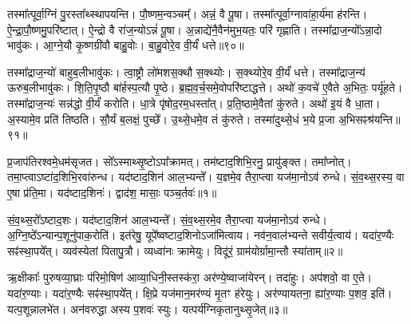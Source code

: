 तस्मा᳚त्पूर्वा॒ग्निं पु॒रस्ता᳚थ्स्थापयन्ति।
पौ॒ष्णम॒न्वञ्चम्᳚।
अन्नं॒ वै पू॒षा।
तस्मा᳚त्पूर्वा॒ग्नावा॑\-हा॒र्य॑मा ह॑रन्ति।
ऐ॒न्द्रा॒पौ॒ष्णमु॒परि॑ष्टात्।
ऐ॒न्द्रो वै रा॑ज॒न्यो\-ऽन्नं॑ पू॒षा।
अ॒न्नाद्ये॑नै॒वैन॑मुभ॒यतः॒ परि॑ गृह्णाति।
तस्मा᳚द्राज॒न्यो᳚\-ऽन्ना॒दो भावु॑कः।
आ॒ग्ने॒यौ कृ॒ष्णग्री॑वौ बाहु॒वोः।
बा॒हु॒वोरे॒व वी॒र्यं॑ धत्ते॥९०॥\ip

तस्मा᳚द्राज॒न्यो॑ बाहुब॒लीभावु॑कः।
त्वा॒ष्ट्रौ लो॑मशस॒क्थौ स॒क्थ्योः।
स॒क्थ्योरे॒व वी॒र्यं॑ धत्ते।
तस्मा᳚द्राज॒न्य॑ ऊरुब॒लीभावु॑कः।
शि॒ति॒पृ॒ष्ठौ बा॑र्\mbox{}हस्प॒त्यौ पृ॒ष्ठे।
ब्र॒ह्म॒व॒र्च॒समे॒वोपरि॑ष्टाद्धत्ते।
अथो॑ क॒वचे॑ ए॒वैते अ॒भितः॒ पर्यू॑हते।
तस्मा᳚द्राज॒न्यः॑ सन्न॑द्धो वी॒र्यं॑ करोति।
धा॒त्रे पृ॑षोद॒रम॒धस्ता᳚त्।
प्र॒ति॒ष्ठामे॒वैतां कु॑रुते।
अथो॑ इ॒यं वै धा॒ता।
अ॒स्यामे॒व प्रति॑ तिष्ठति।
सौ॒र्यं ब॒लक्षं॒ पुच्छे᳚।
उ॒थ्से॒धमे॒व तं कु॑रुते।
तस्मा॑दुथ्से॒धं भ॒ये प्र॒जा अ॒भिसꣴश्र॑यन्ति॥९१॥\ip\anuvakamend[कु॒रु॒ते॒ ध॒त्ते॒ कु॒रु॒ते॒ पञ्च॑ च]


\setcounter{anuvakam}{0}

प्र॒जा\-प॑तिरश्वमे॒धम॑\-सृजत।
सो᳚ऽस्माथ्सृ॒ष्टो\-ऽपा᳚क्रामत्।
तम॑ष्टा\-द॒शिभि॒\-रनु॒\- प्रायु॑ङ्क्त।
तमा᳚प्नोत्।
तमा॒प्त्वा\-ऽष्टा॑द॒शिभि॒रवा॑\-रुन्ध।
यद॑ष्टा\-द॒शिन॑ आल॒भ्यन्ते᳚।
य॒ज्ञमे॒व तैरा॒प्त्वा यज॑मा॒नो\-ऽव॑ रुन्धे।
सं॒व॒थ्स॒\-र\-स्य॒ वा ए॒षा प्र॑ति॒मा।
यद॑ष्टाद॒शिनः॑।
द्वाद॑श॒ मासाः॒ पञ्च॒र्तवः॑॥१॥\ip

सं॒व॒थ्स॒रो᳚\-ऽष्टाद॒शः।
यद॑ष्टाद॒शिन॑ आल॒भ्यन्ते᳚।
सं॒व॒थ्स॒रमे॒व तैरा॒प्त्वा यज॑मा॒नो\-ऽव॑ रुन्धे।
अ॒ग्नि॒ष्ठे᳚\-ऽन्यान्प॒शूनु॑पाक॒रोति॑।
इत॑रेषु॒ यूपे᳚ष्वष्टाद॒शिनो\-ऽजा॑मित्वाय।
नव॑न॒वाल॑भ्यन्ते सवीर्य॒त्वाय॑।
यदा॑र॒ण्यैः सꣴ॑स्था॒पये᳚त्।
व्यव॑स्येतां पितापु॒त्रौ।
व्यध्वा॑नः क्रामेयुः।
विदू॑रं॒ ग्राम॑योर्ग्रामा॒न्तौ स्या॑ताम्॥२॥\ip

ऋ॒क्षीकाः᳚ पुरुषव्या॒घ्राः प॑रिमो॒षिण॑ आव्या॒धिनी॒स्तस्क॑रा॒ अर॑ण्ये॒ष्वाजा॑येरन्।
तदा॑हुः।
अप॑शवो॒ वा ए॒ते।
यदा॑र॒ण्याः।
यदा॑र॒ण्यैः सꣴ॑स्था॒पये᳚त्।
क्षि॒प्रे यज॑मान॒मर॑ण्यं मृ॒तꣳ ह॑रेयुः।
अर॑ण्यायतना॒ ह्या॑र॒ण्याः प॒शव॒ इति॑।
यत्प॒शून्नालभे॑त।
अन॑वरुद्धा अस्य प॒शवः॑ स्युः।
यत्पर्य॑ग्निकृतानुथ्सृ॒जेत्॥३॥\ip

